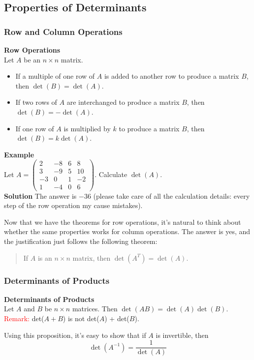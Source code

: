 \documentclass[10pt, a4paper]{article}
\begin{document}
\subsection{Properties of Determinants}
\subsubsection*{Row and Column Operations}
\begin{proposition}
    \textbf{Row Operations}\\
    Let $A$ be an $n\times n$ matrix.
    \begin{itemize}
        \item If a multiple of one row of $A$ is added to another row to produce a matrix $B$, then $\det(B) = \det(A)$.
        \item If two rows of $A$ are interchanged to produce a matrix $B$, then $\det(B) = -\det(A)$.
        \item If one row of $A$ is multiplied by $k$ to produce a matrix $B$, then $\det(B) = k\det(A)$.
    \end{itemize}
\end{proposition}
\begin{example}
    \textbf{Example} \\
    Let $A = \begin{pmatrix} 
        2 & -8 & 6 & 8\\
        3 &-9 & 5 & 10\\
        -3 & 0 & 1 & -2\\
        1 & -4 & 0 & 6
     \end{pmatrix}$. Calculate $\det(A)$.\\
    \textbf{Solution} 
    The answer is $-36$ (please take care of all the calculation details: every step of the row operation my cause mistakes).
\end{example}
Now that we have the theorems for row operations, it's natural to think about whether the same properties works for column operations. The answer is yes, and the justification just follows the following theorem:
\begin{quote}
    If $A$ is an $n\times n$ matrix, then $\det(A^T) = \det(A)$.
\end{quote}
\subsubsection*{Determinants of Products}
\begin{proposition}
    \textbf{Determinants of Products}\\
    Let $A$ and $B$ be $n\times n$ matrices. Then $\det(AB) = \det(A)\det(B)$.\\
    \textcolor{red}{Remark:} det($A+B$) is not det($A$) + det($B$).
\end{proposition}
\indent Using this proposition, it's easy to show that if $A$ is invertible, then $$\det(A^{-1}) = \frac{1}{\det(A)}$$
\end{document}
